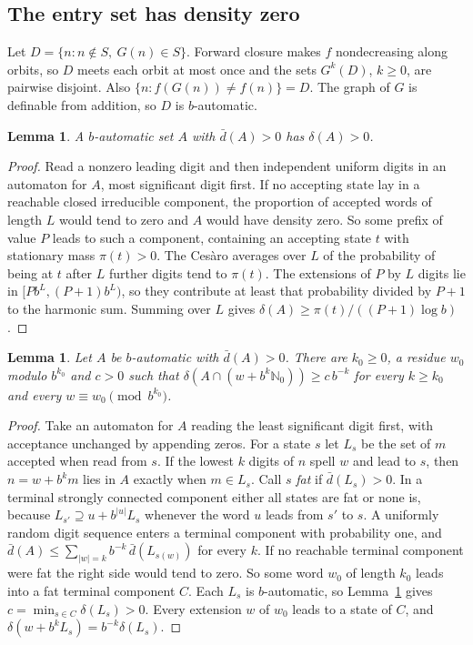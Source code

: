 \documentclass[11pt]{article}
\newtheorem{lemma}[theorem]{Lemma}
\theoremstyle{remark}
\newcommand{\N}{\mathbb{N}_0}
\newcommand{\ud}{\bar d}
\newcommand{\ld}{\delta}
\begin{document}
\subsection{The entry set has density zero}

Let $D=\{n: n\notin S,\ G(n)\in S\}$. Forward closure makes $f$ nondecreasing
along orbits, so $D$ meets each orbit at most once and the sets $G^k(D)$,
$k\ge0$, are pairwise disjoint. Also $\{n:f(G(n))\ne f(n)\}=D$. The graph of $G$
is definable from addition, so $D$ is $b$-automatic.

\begin{lemma}\label{pos}
A $b$-automatic set $A$ with $\ud(A)>0$ has $\ld(A)>0$.
\end{lemma}
\begin{proof}
Read a nonzero leading digit and then independent uniform digits in an
automaton for $A$, most significant digit first. If no accepting state lay in a
reachable closed irreducible component, the proportion of accepted words of
length $L$ would tend to zero and $A$ would have density zero. So some prefix of
value $P$ leads to such a component, containing an accepting state $t$ with
stationary mass $\pi(t)>0$. The Ces\`aro averages over $L$ of the probability of
being at $t$ after $L$ further digits tend to $\pi(t)$. The extensions of $P$ by
$L$ digits lie in $[Pb^L,(P+1)b^L)$, so they contribute at least that
probability divided by $P+1$ to the harmonic sum. Summing over $L$ gives
$\ld(A)\ge\pi(t)/((P+1)\log b)$.
\end{proof}

\begin{lemma}\label{cyl}
Let $A$ be $b$-automatic with $\ud(A)>0$. There are $k_0\ge0$, a residue $w_0$
modulo $b^{k_0}$ and $c>0$ such that $\ld(A\cap(w+b^k\N))\ge c\,b^{-k}$ for every
$k\ge k_0$ and every $w\equiv w_0\pmod{b^{k_0}}$.
\end{lemma}
\begin{proof}
Take an automaton for $A$ reading the least significant digit first, with
acceptance unchanged by appending zeros. For a state $s$ let $L_s$ be the set of
$m$ accepted when read from $s$. If the lowest $k$ digits of $n$ spell $w$ and
lead to $s$, then $n=w+b^km$ lies in $A$ exactly when $m\in L_s$. Call $s$
\emph{fat} if $\ud(L_s)>0$. In a terminal strongly connected component either
all states are fat or none is, because $L_{s'}\supseteq u+b^{|u|}L_s$ whenever
the word $u$ leads from $s'$ to $s$. A uniformly random digit sequence enters a
terminal component with probability one, and
$\ud(A)\le\sum_{|w|=k}b^{-k}\,\ud(L_{s(w)})$ for every $k$. If no reachable
terminal component were fat the right side would tend to zero. So some word
$w_0$ of length $k_0$ leads into a fat terminal component $C$. Each $L_s$ is
$b$-automatic, so Lemma~\ref{pos} gives $c=\min_{s\in C}\ld(L_s)>0$. Every
extension $w$ of $w_0$ leads to a state of $C$, and
$\ld(w+b^kL_s)=b^{-k}\ld(L_s)$.
\end{proof}
\end{document}
